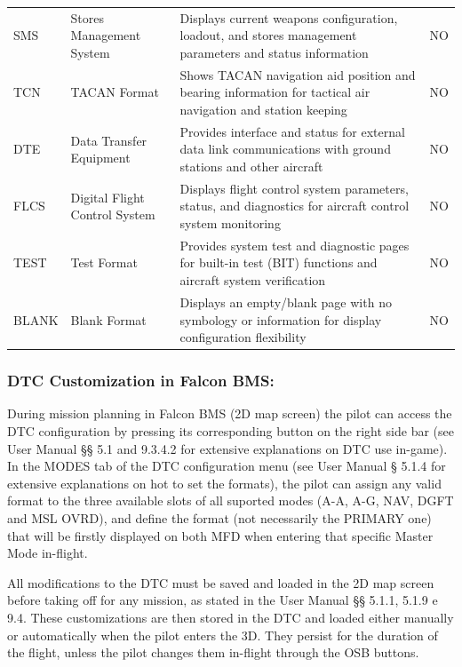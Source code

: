 \documentclass[11pt, a4paper, twoside]{report}
\begin{document}
\begin{longtable}{L{1.8cm} L{5.5cm} L{6.5cm} L{2.5cm}}
	SMS & Stores Management System & Displays current weapons configuration, loadout, and stores management parameters and status information & NO \\
	
	TCN & TACAN Format & Shows TACAN navigation aid position and bearing information for tactical air navigation and station keeping & NO \\
	
	DTE & Data Transfer Equipment & Provides interface and status for external data link communications with ground stations and other aircraft & NO \\
	
	FLCS & Digital Flight Control System & Displays flight control system parameters, status, and diagnostics for aircraft control system monitoring & NO \\
	
	TEST & Test Format & Provides system test and diagnostic pages for built-in test (BIT) functions and aircraft system verification & NO \\
	
	BLANK & Blank Format & Displays an empty/blank page with no symbology or information for display configuration flexibility & NO \\
	
\end{longtable}
\subsubsection{DTC Customization in Falcon BMS:}
\label{sec:C3-S4-S2-S2}

During mission planning in Falcon BMS (2D map screen) the pilot can access the DTC configuration by pressing its corresponding button on the right side bar (see User Manual §§ 5.1 and 9.3.4.2 for extensive explanations on DTC use in-game). In the MODES tab of the DTC configuration menu (see User Manual § 5.1.4 for extensive explanations on hot to set the formats), the pilot can assign any valid format to the three available slots of all suported modes (A-A, A-G, NAV, DGFT and MSL OVRD), and define the format (not necessarily the PRIMARY one) that will be firstly displayed on both MFD when entering that specific Master Mode in-flight.

All modifications to the DTC must be saved and loaded in the 2D map screen before taking off for any mission, as stated in the User Manual §§ 5.1.1, 5.1.9 e 9.4. These customizations are then stored in the DTC and loaded either manually or automatically when the pilot enters the 3D. They persist for the duration of the flight, unless the pilot changes them in-flight through the OSB buttons.
\end{document}
